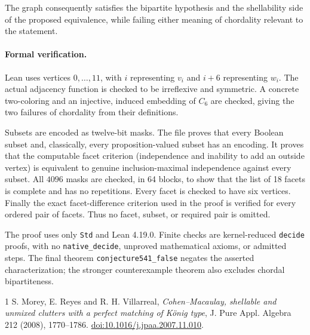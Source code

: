 \documentclass[10pt]{article}
\begin{document}
The graph consequently satisfies the bipartite hypothesis and the
shellability side of the proposed equivalence, while failing either
meaning of chordality relevant to the statement.

\paragraph{Formal verification.}
Lean uses vertices $0,\ldots,11$, with $i$ representing $v_i$ and
$i+6$ representing $w_i$. The actual adjacency function is checked
to be irreflexive and symmetric. A concrete two-coloring and an
injective, induced embedding of $C_6$ are checked, giving the two
failures of chordality from their definitions.

Subsets are encoded as twelve-bit masks. The file proves that every
Boolean subset and, classically, every proposition-valued subset
has an encoding. It proves that the computable facet criterion
(independence and inability to add an outside vertex) is equivalent
to genuine inclusion-maximal independence against every subset.
All $4096$ masks are checked, in 64 blocks, to show that the list
of 18 facets is complete and has no repetitions. Every facet is
checked to have six vertices. Finally the exact facet-difference
criterion used in the proof is verified for every ordered pair of
facets. Thus no facet, subset, or required pair is omitted.

The proof uses only \texttt{Std} and Lean 4.19.0. Finite checks are
kernel-reduced \texttt{decide} proofs, with no \texttt{native\_decide},
unproved mathematical axioms, or admitted steps. The final theorem
\texttt{conjecture541\_\allowbreak{}false} negates the asserted characterization;
the stronger counterexample theorem also excludes chordal
bipartiteness.

\begin{thebibliography}{1}
 S. Morey, E. Reyes and R. H. Villarreal,
\emph{Cohen--Macaulay, shellable and unmixed clutters with a perfect
matching of K\"onig type}, J. Pure Appl. Algebra 212 (2008), 1770--1786.
\href{https://doi.org/10.1016/j.jpaa.2007.11.010}{doi:10.1016/j.jpaa.2007.11.010}.
\end{thebibliography}
\end{document}
